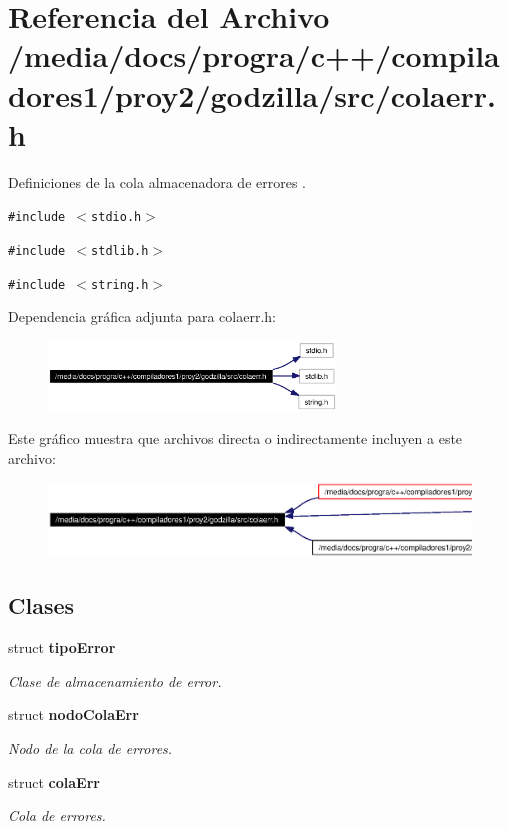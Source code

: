 \section{Referencia del Archivo /media/docs/progra/c++/compiladores1/proy2/godzilla/src/colaerr.h}
\label{colaerr_8h}
Definiciones de la cola almacenadora de errores . 

{\tt \#include $<$stdio.h$>$}\par
{\tt \#include $<$stdlib.h$>$}\par
{\tt \#include $<$string.h$>$}\par


Dependencia gr\'{a}fica adjunta para colaerr.h:\begin{figure}[H]
\begin{center}
\leavevmode
\includegraphics[width=217pt]{colaerr_8h__incl}
\end{center}
\end{figure}


Este gr\'{a}fico muestra que archivos directa o indirectamente incluyen a este archivo:\begin{figure}[H]
\begin{center}
\leavevmode
\includegraphics[width=420pt]{colaerr_8h__dep__incl}
\end{center}
\end{figure}
\subsection*{Clases}
\begin{CompactItemize}
\item 
struct {\bf tipo\-Error}
\begin{CompactList}\small\item\em Clase de almacenamiento de error. \item\end{CompactList}\item 
struct {\bf nodo\-Cola\-Err}
\begin{CompactList}\small\item\em Nodo de la cola de errores. \item\end{CompactList}\item 
struct {\bf cola\-Err}
\begin{CompactList}\small\item\em Cola de errores. \item\end{CompactList}\end{CompactItemize}
